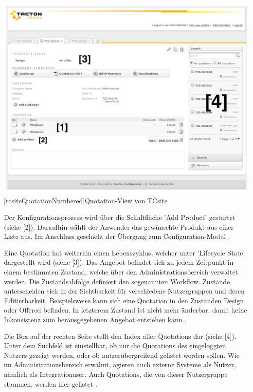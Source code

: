 \documentclass[12pt,a4paper,bibliography=totocnumbered,listof=totoc]{scrartcl}
\begin{document}
\vspace{1em}
\begin{minipage}{\linewidth}
	\centering
	\includegraphics[width=0.7\linewidth]{Abbildungen/tcsiteQuotationNumbered.pdf}
	[tcsiteQuotationNumbered]{Quotation-View von TCsite}
	\label{fig:tcsiteQuotationNumbered}
\end{minipage}
\vspace{1em}


Der Konfigurationsprozess wird über die Schaltfläche 'Add Product' gestartet (siehe [2]). Daraufhin wählt der Anwender das gewünschte Produkt aus einer Liste aus. Im Anschluss geschieht der Übergang zum Configuration-Modul \citep{tactonTCsiteReferenceManual}.

Eine Quotation hat weiterhin einen Lebenszyklus, welcher unter 'Lifecycle State' dargestellt wird (siehe [3]). Das Angebot befindet sich zu jedem Zeitpunkt in einem bestimmten Zustand, welche über den Administrationsbereich verwaltet werden. Die Zustandsabfolge definiert den sogenannten \glqq Workflow\grqq{}. Zustände unterscheiden sich in der Sichtbarkeit für verschiedene Nutzergruppen und deren Editierbarkeit. Beispielsweise kann sich eine Quotation in den Zuständen \glqq Design\grqq{} oder \glqq Offered\grqq{} befinden. In letzterem Zustand ist nicht mehr änderbar, damit keine Inkonsistenz zum herausgegebenen Angebot entstehen kann \citep{tactonTCsiteReferenceManual}.

Die Box auf der rechten Seite stellt den Index aller Quotations dar (siehe [4]). Unter dem Suchfeld ist einstellbar, ob nur die Quotations des eingeloggten Nutzers gezeigt werden, oder ob nutzerübergreifend gelistet werden sollen. Wie im Administrationsbereich erwähnt, agieren auch externe Systeme als Nutzer, nämlich als Integrationuser. Auch Quotations, die von dieser Nutzergruppe stammen, werden hier gelistet \citep{tactonTCsiteReferenceManual}.
\end{document}
